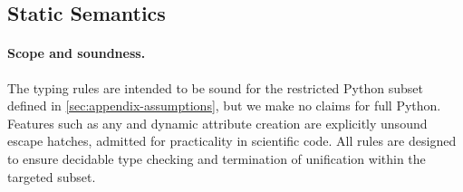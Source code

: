 \subsection{Static Semantics}
\label{subsec:static-semantics}

\paragraph{Scope and soundness.}
The typing rules are intended to be sound for the restricted Python subset
defined in \autoref{sec:appendix-assumptions}, but we make no claims for full Python.
Features such as \textsf{any} and dynamic attribute creation are explicitly
unsound escape hatches, admitted for practicality in scientific code.  
All rules are designed to ensure decidable type checking and termination of unification
within the targeted subset.
